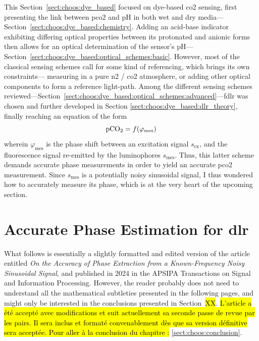 This Section~\ref{sect:choos:dye_based} focused on dye-based \gls{co2} sensing, first presenting the link between \gls{pco2} and pH in both wet and dry media---Section~\ref{sect:choos:dye_based:chemistry}. Adding an acid-base indicator exhibiting differing optical properties between its protonated and anionic forms then allows for an optical determination of the sensor's pH---Section~\ref{sect:choos:dye_based:optical_schemes:basic}. However, most of the classical sensing schemes call for some kind of referencing, which brings its own constraints---\eg{} measuring in a pure \gls{n2} / \gls{co2} atmosphere, or adding other optical components to form a reference light-path. Among the different sensing schemes reviewed---Section~\ref{sect:choos:dye_based:optical_schemes:advanced}---\gls{fdlr} was chosen and further developed in Section \ref{sect:choos:dye_based:dlr_theory}, finally reaching an equation of the form
\begin{equation}
	\ce{pCO_2} = f(\varphi_\text{mes})
\end{equation}
wherein $\varphi_\text{mes}$ is the phase shift between an excitation signal $s_\text{ex}$, and the fluorescence signal re-emitted by the luminophores $s_\text{mes}$. Thus, this latter scheme demands accurate phase measurements in order to yield an accurate \gls{pco2} measurement. Since $s_\text{mes}$ is a potentially noisy sinusoidal signal, I thus wondered how to accurately measure its phase, which is at the very heart of the upcoming section.

\section{Accurate Phase Estimation for \texorpdfstring{\gls{dlr}}{DLR}}\label{sect:choos:phase_mes}

What follows is essentially a slightly formatted and edited version of the article entitled \textit{On the Accuracy of Phase Extraction from a Known-Frequency Noisy	Sinusoidal Signal}, and published in 2024 in the APSIPA Transactions on Signal and Information Processing\cite{dervieux2024phase}. However, the reader probably does not need to understand all the mathematical subtleties presented in the following pages, and might only be interested in the conclusions presented in Section~\hl{XX}. \hl{L'article a été accepté avec modifications et suit actuellement sa seconde passe de revue par les pairs. Il sera inclus et formaté convenablement dès que sa version définitive sera acceptée. Pour aller à la conclusion du chapitre :} \ref{sect:choos:conclusion}.

